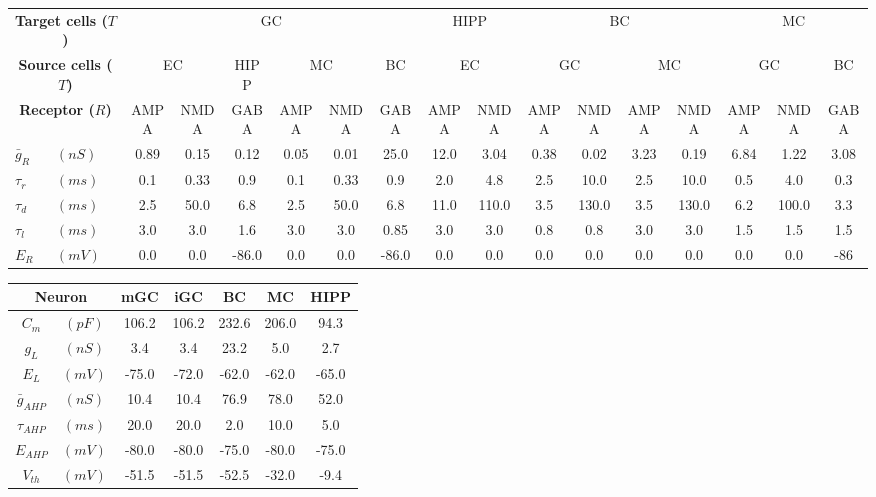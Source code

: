 \documentclass{article}
\begin{document}
\begin{center}


\begin{table}[h!]
\centering
\renewcommand{\arraystretch}{1.4}
\begin{tabular}{llccccccccccccccc}
\toprule
\multicolumn{2}{c}{\textbf{Target cells ($T$)}} & \multicolumn{6}{c}{GC} & \multicolumn{2}{c}{HIPP} & \multicolumn{4}{c}{BC} & \multicolumn{3}{c}{MC}  \\
\cline{3-8}
\cline{11-14}
\multicolumn{2}{c}{\textbf{Source cells ($T$)}} & \multicolumn{2}{c}{EC} & \multicolumn{1}{c}{HIPP} & \multicolumn{2}{c}{MC} & \multicolumn{1}{c}{BC} & \multicolumn{2}{c}{EC} & \multicolumn{2}{c}{GC} & \multicolumn{2}{c}{MC} & \multicolumn{2}{c}{GC} & \multicolumn{1}{c}{BC}  \\
\cline{3-4}
\cline{6-7}
\cline{9-10}
\cline{13-14}
\cline{17-17}
\multicolumn{2}{c}{\textbf{Receptor ($R$)}} & AMPA & NMDA & GABA & AMPA & NMDA & GABA & AMPA & NMDA & AMPA & NMDA & AMPA & NMDA & AMPA & NMDA & GABA\\
\midrule
$\bar{g}_R$ & $(nS)$ & 0.89 & 0.15 & 0.12 & 0.05 & 0.01 & 25.0 & 12.0 & 3.04 & 0.38 & 0.02 & 3.23 & 0.19& 6.84 & 1.22 & 3.08\\
$\tau_{r}$ & $(ms)$ & 0.1 & 0.33 & 0.9 & 0.1 & 0.33 & 0.9 & 2.0 &4.8  & 2.5& 10.0 &2.5& 10.0 & 0.5& 4.0 & 0.3\\
$\tau_{d}$ & $(ms)$ & 2.5 & 50.0 & 6.8 & 2.5 & 50.0 & 6.8 & 11.0& 110.0 & 3.5 &130.0 &3.5& 130.0 &6.2 &100.0 & 3.3\\
$\tau_{l}$ & $(ms)$ & 3.0 & 3.0 & 1.6 & 3.0 & 3.0 & 0.85 & 3.0& 3.0 & 0.8 &0.8 &3.0 &3.0 &1.5& 1.5 & 1.5\\
$E_R$      & $(mV)$     & 0.0 & 0.0 & -86.0 & 0.0 & 0.0 & -86.0 & 0.0 & 0.0 & 0.0 & 0.0 & 0.0 & 0.0 & 0.0 & 0.0 & -86\\
\bottomrule
\end{tabular}
\end{table}


\begin{table}[h!]
\centering
\renewcommand{\arraystretch}{1.4}
\begin{tabular}{ccccccc}
\toprule
\multicolumn{2}{c}{\textbf{Neuron}} & mGC & iGC & BC & MC & HIPP \\
\midrule
$C_m$ & $(pF)$ &106.2&106.2 & 232.6 & 206.0 & 94.3\\
$g_{L}$ & $(nS)$ & 3.4& 3.4 & 23.2 & 5.0 & 2.7 \\
$E_{L}$ & $(mV)$ & -75.0& -72.0  &-62.0 & -62.0 & -65.0 \\
$\bar{g}_{AHP}$ & $(nS)$ & 10.4& 10.4 & 76.9 & 78.0 & 52.0  \\
$\tau_{AHP}$ & $(ms)$ & 20.0& 20.0  &2.0 & 10.0 & 5.0  \\
$E_{AHP}$ & $(mV)$ & -80.0& -80.0 & -75.0 & -80.0  &-75.0 \\
$V_{th}$ & $(mV)$ & -51.5& -51.5 & -52.5 & -32.0 & -9.4  \\
\bottomrule
\end{tabular}
\end{table}

\end{center}
\end{document}
